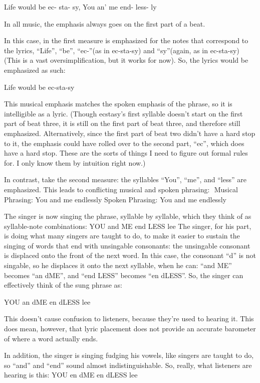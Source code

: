 \documentclass[10pt,oneside]{memoir}
\begin{document}
Life   would be  ec-            sta-    sy,        You  an'  me   end-  less- ly 


In all music, the emphasis always goes on the first part of a beat.  


In this case, in the first measure is emphasized for the notes that correspond to the lyrics, ``Life'', ``be'', ``ec-''(as in ec-sta-sy)  and ``sy''(again, as in ec-sta-sy) (This is a vast oversimplification, but it works for now). So, the lyrics would be emphasized as such:


Life would be ec-sta-sy


This musical emphasis matches the spoken emphasis of the phrase, so it is intelligible as a lyric.  (Though ecstasy's first syllable doesn't start on the first part of beat three, it is still on the first part of beat three, and therefore still emphasized.  Alternatively, since the first part of beat two didn't have a hard stop to it, the emphasis could have rolled over to the second part,  ``ec'', which does have a hard stop. These are the sorts of things I need to figure out formal rules for.  I only know them by intuition right now.)


In contrast, take the second measure:  the syllables ``You'', ``me'', and ``less'' are emphasized.  This leads to conflicting musical and spoken phrasing: 
Musical Phrasing:   You and me  endlessly
Spoken Phrasing:    You and me  endlessly


The singer is now singing the phrase, syllable by syllable, which they think of as syllable-note combinations:
YOU and ME end LESS lee
The singer, for his part, is doing what many singers are taught to do, to make it easier to sustain the singing of words that end with unsingable consonants: the unsingable consonant is displaced onto the front of the next word.  In this case, the consonant ``d'' is not singable, so he displaces it onto the next syllable, when he can:  ``and ME'' becomes ``an   dME'', and ``end LESS''  becomes ``en  dLESS''.  So, the singer can effectively think of the sung phrase as:


YOU an  dME en dLESS lee


This doesn't cause confusion to listeners, because they're used to hearing it.  This does mean, however, that lyric placement does not provide an accurate barometer of where a word actually ends.   


In addition, the singer is singing fudging his vowels, like singers are taught to do,   so ``and'' and ``end'' sound almost indistinguishable.  So, really, what listeners are hearing is this:
  YOU en dME en dLESS lee
\end{document}
